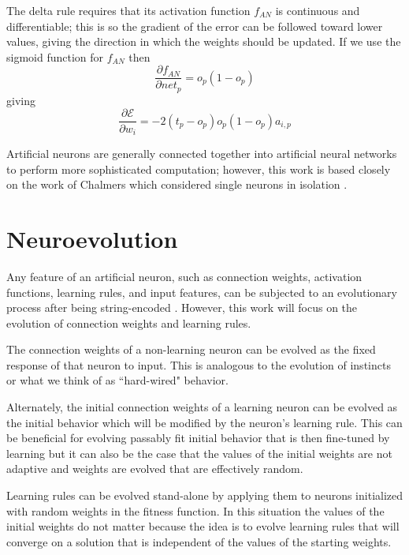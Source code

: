 \documentclass[master]{outhesis}
\begin{document}
The delta rule requires that its activation function $f_{AN}$ is continuous and differentiable;
this is so the gradient of the error can be followed toward lower values, giving the direction in which the weights should be updated.
If we use the sigmoid function for $f_{AN}$ then
\begin{displaymath}
\frac{\partial f_{AN}}{\partial net_p} = o_p(1 - o_p)
\end{displaymath}
giving
\begin{displaymath}
\frac{\partial \mathcal{E}}{\partial w_i} = -2(t_p - o_p)o_p(1 - o_p)a_{i,p}
\end{displaymath}

Artificial neurons are generally connected together into artificial neural networks to perform more sophisticated computation;
however, this work is based closely on the work of Chalmers which considered single neurons in isolation \cite{chalmers-evolution-learning}.

\section{Neuroevolution}

Any feature of an artificial neuron, such as connection weights, activation functions, learning rules, and input features, can be subjected to an evolutionary process after being string-encoded \cite{Yao:1999lp}.
However, this work will focus on the evolution of connection weights and learning rules.

The connection weights of a non-learning neuron can be evolved as the fixed response of that neuron to input.
This is analogous to the evolution of instincts or what we think of as ``hard-wired" behavior.

Alternately, the initial connection weights of a learning neuron can be evolved as the initial behavior which will be modified by the neuron's learning rule.
This can be beneficial for evolving passably fit initial behavior that is then fine-tuned by learning
but it can also be the case that the values of the initial weights are not adaptive and weights are evolved that are effectively random.

Learning rules can be evolved stand-alone by applying them to neurons initialized with random weights in the fitness function.
In this situation the values of the initial weights do not matter because the idea is to evolve learning rules that will converge on a solution that is independent of the values of the starting weights.
\end{document}
